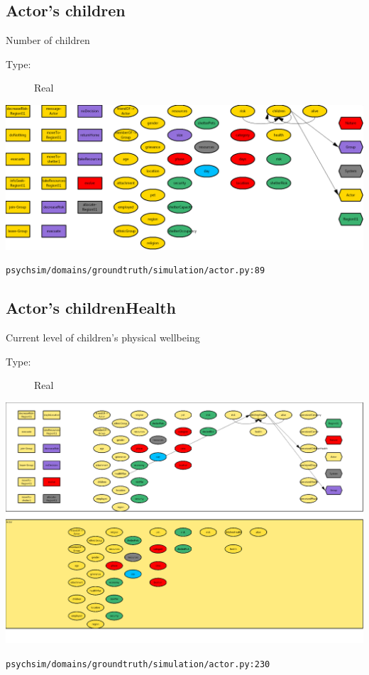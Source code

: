 \documentclass{article}%
\begin{document}
%
\subsection{Actor's children}%
\label{subsec:Actor's children}%
Number of children%
\begin{description}%
\item[Type:]%
Real%
\end{description}%
\includegraphics[width=\textwidth]{images/childrenOfActor.png}%
\begin{flushleft}%
\verb|psychsim/domains/groundtruth/simulation/actor.py:89|%
\end{flushleft}

%
\subsection{Actor's childrenHealth}%
\label{subsec:Actor's childrenHealth}%
Current level of children's physical wellbeing%
\begin{description}%
\item[Type:]%
Real%
\end{description}%
\includegraphics[width=\textwidth]{images/childrenHealthOfActor.png}%
\begin{flushleft}%
\verb|psychsim/domains/groundtruth/simulation/actor.py:230|%
\end{flushleft}%
\end{document}
